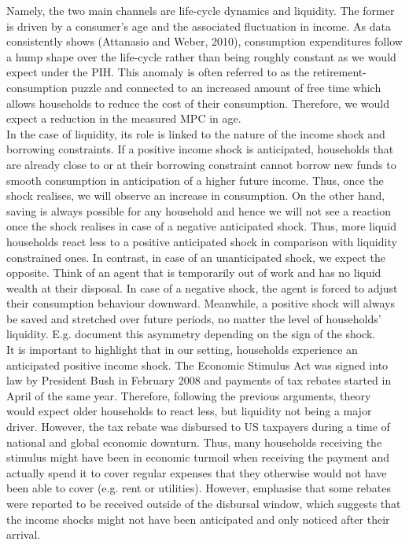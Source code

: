 Namely, the two main channels are life-cycle dynamics and liquidity. The former is driven by a consumer's age and the associated fluctuation in income. As data consistently shows (Attanasio and Weber, 2010), consumption expenditures follow a hump shape over the life-cycle rather than being roughly constant as we would expect under the PIH. This anomaly is often referred to as the retirement-consumption puzzle and connected to an increased amount of free time which allows households to reduce the cost of their consumption. Therefore, we would expect a reduction in the measured MPC in age. \\
In the case of liquidity, its role is linked to the nature of the income shock and borrowing constraints. If a positive income shock is anticipated, households that are already close to or at their borrowing constraint cannot borrow new funds to smooth consumption in anticipation of a higher future income. Thus, once the shock realises, we will observe an increase in consumption. On the other hand, saving is always possible for any household and hence we will not see a reaction once the shock realises in case of a negative anticipated shock. Thus, more liquid households react less to a positive anticipated shock in comparison with liquidity constrained ones. In contrast, in case of an unanticipated shock, we expect the opposite. Think of an agent that is temporarily out of work and has no liquid wealth at their disposal. In case of a negative shock, the agent is forced to adjust their consumption behaviour downward. Meanwhile, a positive shock will always be saved and stretched over future periods, no matter the level of households' liquidity. E.g. \cite{bunn_etal} document this asymmetry depending on the sign of the shock. \\
It is important to highlight that in our setting, households experience an anticipated positive income shock. The Economic Stimulus Act was signed into law by President Bush in February 2008 and payments of tax rebates started in April of the same year. Therefore, following the previous arguments, theory would expect older households to react less, but liquidity not being a major driver. However, the tax rebate was disbursed to US taxpayers during a time of national and global economic downturn. Thus, many households receiving the stimulus might have been in economic turmoil when receiving the payment and actually spend it to cover regular expenses that they otherwise would not have been able to cover (e.g. rent or utilities). However, \cite{parker_etal_13} emphasise that some rebates were reported to be received outside of the disbursal window, which suggests that the income shocks might not have been anticipated and only noticed after their arrival. \\
